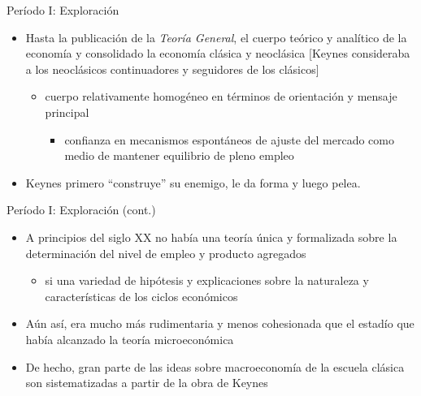 \documentclass[
  ignorenonframetext,
]{beamer}
\providecommand{\tightlist}{%
  \setlength{\itemsep}{0pt}\setlength{\parskip}{0pt}}\usepackage{longtable,booktabs,array}
\begin{document}
\begin{frame}{Período I: Exploración}
\protect\hypertarget{peruxedodo-i-exploraciuxf3n}{}
\begin{itemize}
\tightlist
\item
  Hasta la publicación de la \emph{Teoría General}, el cuerpo teórico y
  analítico de la economía y consolidado la economía clásica y
  neoclásica {[}Keynes consideraba a los neoclásicos continuadores y
  seguidores de los clásicos{]}

  \begin{itemize}
  \tightlist
  \item
    cuerpo relativamente homogéneo en términos de orientación y mensaje
    principal

    \begin{itemize}
    \tightlist
    \item
      confianza en mecanismos espontáneos de ajuste del mercado como
      medio de mantener equilibrio de pleno empleo
    \end{itemize}
  \end{itemize}
\item
  Keynes primero ``construye'' su enemigo, le da forma y luego pelea.
\end{itemize}
\end{frame}

\begin{frame}{Período I: Exploración (cont.)}
\protect\hypertarget{peruxedodo-i-exploraciuxf3n-cont.}{}
\begin{itemize}
\tightlist
\item
  A principios del siglo XX no había una teoría única y formalizada
  sobre la determinación del nivel de empleo y producto agregados

  \begin{itemize}
  \tightlist
  \item
    si una variedad de hipótesis y explicaciones sobre la naturaleza y
    características de los ciclos económicos
  \end{itemize}
\item
  Aún así, era mucho más rudimentaria y menos cohesionada que el estadío
  que había alcanzado la teoría microeconómica
\item
  De hecho, gran parte de las ideas sobre macroeconomía de la escuela
  clásica son sistematizadas a partir de la obra de Keynes
\end{itemize}
\end{frame}
\end{document}
